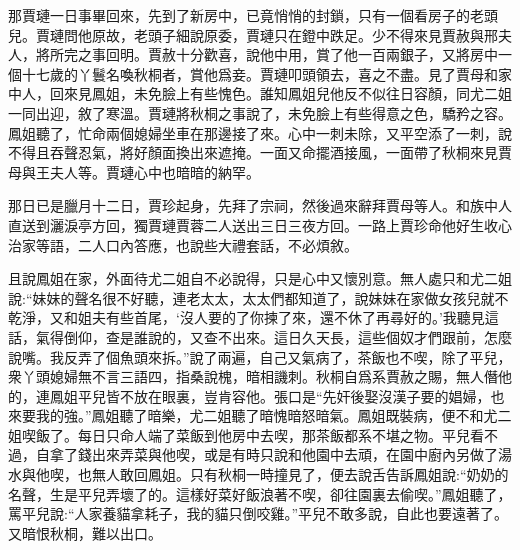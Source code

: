 \begin{parag}
    那賈璉一日事畢回來，先到了新房中，已竟悄悄的封鎖，只有一個看房子的老頭兒。賈璉問他原故，老頭子細說原委，賈璉只在鐙中跌足。少不得來見賈赦與邢夫人，將所完之事回明。賈赦十分歡喜，說他中用，賞了他一百兩銀子，又將房中一個十七歲的丫鬟名喚秋桐者，賞他爲妾。賈璉叩頭領去，喜之不盡。見了賈母和家中人，回來見鳳姐，未免臉上有些愧色。誰知鳳姐兒他反不似往日容顏，同尤二姐一同出迎，敘了寒溫。賈璉將秋桐之事說了，未免臉上有些得意之色，驕矜之容。鳳姐聽了，忙命兩個媳婦坐車在那邊接了來。心中一刺未除，又平空添了一刺，說不得且吞聲忍氣，將好顏面換出來遮掩。一面又命擺酒接風，一面帶了秋桐來見賈母與王夫人等。賈璉心中也暗暗的納罕。
\end{parag}


\begin{parag}
    那日已是臘月十二日，賈珍起身，先拜了宗祠，然後過來辭拜賈母等人。和族中人直送到灑淚亭方回，獨賈璉賈蓉二人送出三日三夜方回。一路上賈珍命他好生收心治家等語，二人口內答應，也說些大禮套話，不必煩敘。
\end{parag}


\begin{parag}
    且說鳳姐在家，外面待尤二姐自不必說得，只是心中又懷別意。無人處只和尤二姐說:“妹妹的聲名很不好聽，連老太太，太太們都知道了，說妹妹在家做女孩兒就不乾淨，又和姐夫有些首尾，‘沒人要的了你揀了來，還不休了再尋好的。’我聽見這話，氣得倒仰，查是誰說的，又查不出來。這日久天長，這些個奴才們跟前，怎麼說嘴。我反弄了個魚頭來拆。”說了兩遍，自己又氣病了，茶飯也不喫，除了平兒，衆丫頭媳婦無不言三語四，指桑說槐，暗相譏刺。秋桐自爲系賈赦之賜，無人僭他的，連鳳姐平兒皆不放在眼裏，豈肯容他。張口是“先奸後娶沒漢子要的娼婦，也來要我的強。”鳳姐聽了暗樂，尤二姐聽了暗愧暗怒暗氣。鳳姐既裝病，便不和尤二姐喫飯了。每日只命人端了菜飯到他房中去喫，那茶飯都系不堪之物。平兒看不過，自拿了錢出來弄菜與他喫，或是有時只說和他園中去頑，在園中廚內另做了湯水與他喫，也無人敢回鳳姐。只有秋桐一時撞見了，便去說舌告訴鳳姐說:“奶奶的名聲，生是平兒弄壞了的。這樣好菜好飯浪著不喫，卻往園裏去偷喫。”鳳姐聽了，罵平兒說:“人家養貓拿耗子，我的貓只倒咬雞。”平兒不敢多說，自此也要遠著了。又暗恨秋桐，難以出口。
\end{parag}


